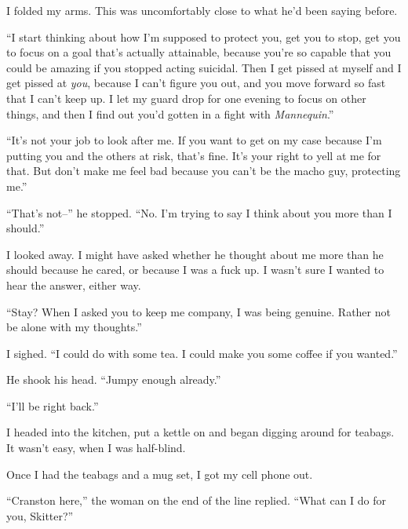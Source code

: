 I folded my arms.  This was uncomfortably close to what he'd been saying before.



``I start thinking about how I'm supposed to protect you, get you to stop, get you to focus on a goal that's actually attainable, because you're so capable that you could be amazing if you stopped acting suicidal.  Then I get pissed at myself and I get pissed at \emph{you}, because I can't figure you out, and you move forward so fast that I can't keep up.  I let my guard drop for one evening to focus on other things, and then I find out you'd gotten in a fight with \emph{Mannequin}.''



``It's not your job to look after me.  If you want to get on my case because I'm putting you and the others at risk, that's fine.  It's your right to yell at me for that.  But don't make me feel bad because you can't be the macho guy, protecting me.''



``That's not--'' he stopped.  ``No.  I'm trying to say I think about you more than I should.''



I looked away.  I might have asked whether he thought about me more than he should because he cared, or because I was a fuck up.  I wasn't sure I wanted to hear the answer, either way.



``Stay?  When I asked you to keep me company, I was being genuine.  Rather not be alone with my thoughts.''



I sighed.  ``I could do with some tea.  I could make you some coffee if you wanted.''



He shook his head.  ``Jumpy enough already.''



``I'll be right back.''



I headed into the kitchen, put a kettle on and began digging around for teabags.  It wasn't easy, when I was half-blind.



Once I had the teabags and a mug set, I got my cell phone out.



``Cranston here,'' the woman on the end of the line replied.  ``What can I do for you, Skitter?''



